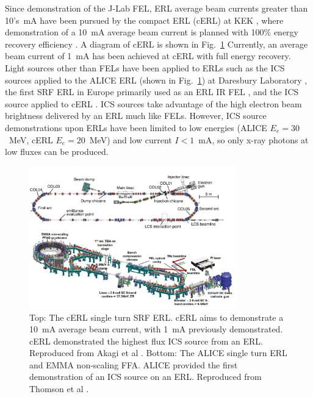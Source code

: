 \documentclass[../main.tex]{subfiles}
\begin{document}
Since demonstration of the J-Lab FEL, ERL average beam currents greater than 10's~\si{\milli\ampere} have been pursued by the compact ERL (cERL) at KEK \cite{akagi2016narrow}, where demonstration of a 10~\si{\milli\ampere} average beam current is planned with 100\% energy recovery efficiency \cite{adolphsen2022european}. A diagram of cERL is shown in Fig.~\ref{fig:cERL_ALICE_diagram} Currently, an average beam current of 1~\si{\milli\ampere} has been achieved at cERL \cite{obina20191} with full energy recovery. Light sources other than FELs have been applied to ERLs such as the ICS sources applied to the ALICE ERL (shown in Fig.~\ref{fig:cERL_ALICE_diagram}) at Daresbury Laboratory \cite{priebe2008inverse,priebe2010first}, the first SRF ERL in Europe primarily used as an ERL IR FEL \cite{thompson2014status}, and the ICS source applied to cERL \cite{akagi2016narrow}. ICS sources take advantage of the high electron beam brightness delivered by an ERL much like FELs. However, ICS source demonstrations upon ERLs have been limited to low energies (ALICE $E_{e}=30$~\si{\mega\electronvolt}, cERL  $E_{e}=20$~\si{\mega\electronvolt}) and low current $I < 1$~\si{\milli\ampere}, so only x-ray photons at low fluxes can be produced. 
\begin{figure}[!h]
\centering
\includegraphics[width=0.8\textwidth]{Figures/Introduction/cERL_ALICE.pdf}
\caption{Top: The cERL single turn SRF ERL. cERL aims to demonstrate a 10~\si{\milli\ampere} average beam current, with 1~\si{\milli\ampere} previously demonstrated. cERL demonstrated the highest flux ICS source from an ERL. Reproduced from Akagi et al \cite{akagi2016narrow}. Bottom: The ALICE single turn ERL and EMMA non-scaling FFA. ALICE provided the first demonstration of an ICS source on an ERL. Reproduced from Thomson et al \cite{thompson2014status}.}
\label{fig:cERL_ALICE_diagram}
\end{figure}
\end{document}
